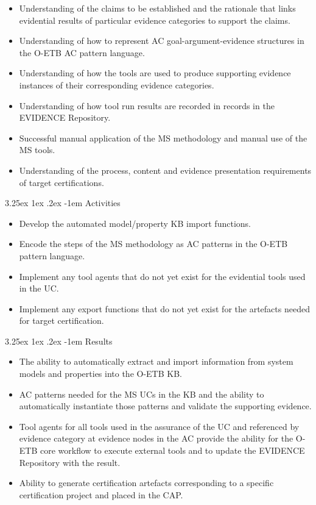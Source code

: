 \documentclass[12pt,twoside,a4paper]{article}
\makeatletter
\renewcommand\paragraph{\@startsection{paragraph}{5}{\z@}%
  {3.25ex \@plus1ex \@minus.2ex}%
  {-1em}%
  {\normalfont\normalsize\bfseries}}
\makeatother
\begin{document}
\begin{itemize}
\item
  Understanding of the claims to be established and the rationale that links evidential results of particular evidence categories to support the claims.
\item
  Understanding of how to represent AC goal-argument-evidence structures in the O-ETB AC pattern language.
\item
  Understanding of how the tools are used to produce supporting evidence instances of their corresponding evidence categories.
\item
  Understanding of how tool run results are recorded in records in the EVIDENCE Repository.
\item
  Successful manual application of the MS methodology and manual use of the MS tools.
\item
  Understanding of the process, content and evidence presentation requirements of target certifications.
\end{itemize}

\hypertarget{activities-1}{%
\paragraph{Activities}\label{activities-1}}

\begin{itemize}
\item
  Develop the automated model/property KB import functions.
\item
  Encode the steps of the MS methodology as AC patterns in the O-ETB pattern language.
\item
  Implement any tool agents that do not yet exist for the evidential tools used in the UC.
\item
  Implement any export functions that do not yet exist for the artefacts needed for target certification.
\end{itemize}

\hypertarget{results-1}{%
\paragraph{Results}\label{results-1}}

\begin{itemize}
\item
  The ability to automatically extract and import information from system models and properties into the O-ETB KB.
\item
  AC patterns needed for the MS UCs in the KB and the ability to automatically instantiate those patterns and validate the supporting evidence.
\item
  Tool agents for all tools used in the assurance of the UC and referenced by evidence category at evidence nodes in the AC provide the ability for the O-ETB core workflow to execute external tools and to update the EVIDENCE Repository with the result.
\item
  Ability to generate certification artefacts corresponding to a specific certification project and placed in the CAP.
\end{itemize}
\end{document}
